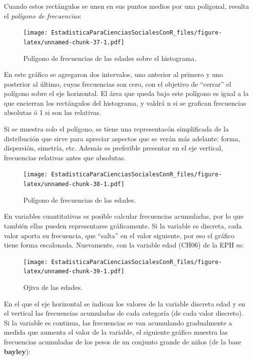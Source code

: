 \documentclass[]{book}
\begin{document}
Cuando estos rectángulos se unen en sus puntos medios por una poligonal, resulta el \emph{polígono de frecuencias}:

\begin{figure}
\centering
\texttt{[image: EstadisticaParaCienciasSocialesConR\_files/figure-latex/unnamed-chunk-37-1.pdf]}
\caption{\label{fig:unnamed-chunk-37}Polígono de frecuencias de las edades sobre el histograma.}
\end{figure}

En este gráfico se agregaron dos intervalos, uno anterior al primero y uno posterior al último, cuyas frecuencias son cero, con el objetivo de ``cerrar'' el polígono sobre el eje horizontal.
El área que queda bajo este polígono es igual a la que encierran los rectángulos del histograma, y valdrá n si se grafican frecuencias absolutas ó 1 si son las relativas.

Si se muestra solo el polígono, se tiene una representacón simplificada de la distribución que sirve para apreciar aspectos que se verán más adelante: forma, dispersión, simetría, etc. Además es preferible presentar en el eje vertical, frecuencias relativas antes que absolutas.

\begin{figure}
\centering
\texttt{[image: EstadisticaParaCienciasSocialesConR\_files/figure-latex/unnamed-chunk-38-1.pdf]}
\caption{\label{fig:unnamed-chunk-38}Polígono de frecuencias de las edades.}
\end{figure}

En variables cuantitativas es posible calcular frecuencias acumuladas, por lo que también ellas pueden representarse gráficamente. Si la variable es discreta, cada valor aporta su frecuencia, que ``salta'' en el valor siguiente, por eso el gráfico tiene forma escalonada. Nuevamente, con la variable edad (CH06) de la EPH es:

\begin{figure}
\centering
\texttt{[image: EstadisticaParaCienciasSocialesConR\_files/figure-latex/unnamed-chunk-39-1.pdf]}
\caption{\label{fig:unnamed-chunk-39}Ojiva de las edades.}
\end{figure}

En el que el eje horizontal se indican los valores de la variable discreta edad y en el vertical las frecuencias acumuladas de cada categoría (de cada valor discreto).
Si la variable es continua, las frecuencias se van acumulando gradualmente a medida que aumenta el valor de la variable, el siguiente gráfico muestra las frecuencias acumuladas de los pesos de un conjunto grande de niños (de la base \textbf{bayley}):
\end{document}
